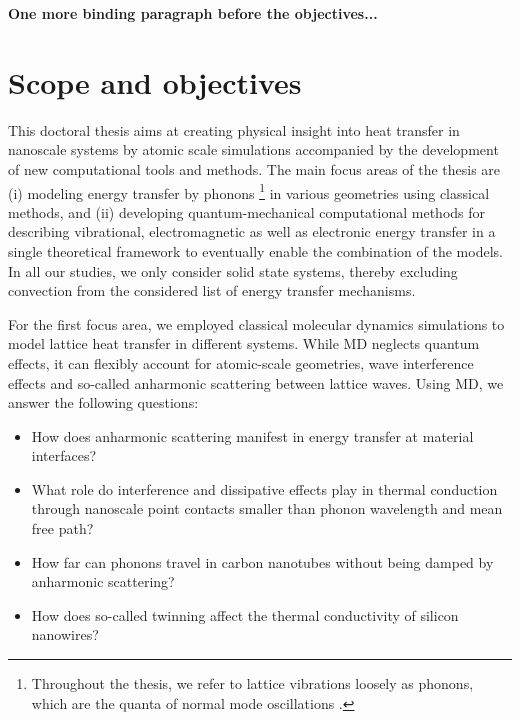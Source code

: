 \textbf{One more binding paragraph before the objectives...}

\section{Scope and objectives}

This doctoral thesis aims at creating physical insight into heat transfer in nanoscale systems by atomic scale simulations accompanied by the development of new computational tools and methods. The main focus areas of the thesis are (i) modeling energy transfer by phonons \footnote{Throughout the thesis, we refer to lattice vibrations loosely as phonons, which are the quanta of normal mode oscillations \cite{ziman}.} in various geometries using classical methods, and (ii) developing quantum-mechanical computational methods for describing vibrational, electromagnetic as well as electronic energy transfer in a single theoretical framework to eventually enable the combination of the models. In all our studies, we only consider solid state systems, thereby excluding convection from the considered list of energy transfer mechanisms. %

For the first focus area, we employed classical molecular dynamics simulations to model lattice heat transfer in different systems. While MD neglects quantum effects, it can flexibly account for atomic-scale geometries, wave interference effects and so-called anharmonic scattering between lattice waves. Using MD, we answer the following questions: 
 \begin{itemize}
  \item How does anharmonic scattering manifest in energy transfer at material interfaces?
  \item What role do interference and dissipative effects play in thermal conduction through nanoscale point contacts smaller than phonon wavelength and mean free path?
  \item How far can phonons travel in carbon nanotubes without being damped by anharmonic scattering?
  \item How does so-called twinning affect the thermal conductivity of silicon nanowires?
 \end{itemize}

